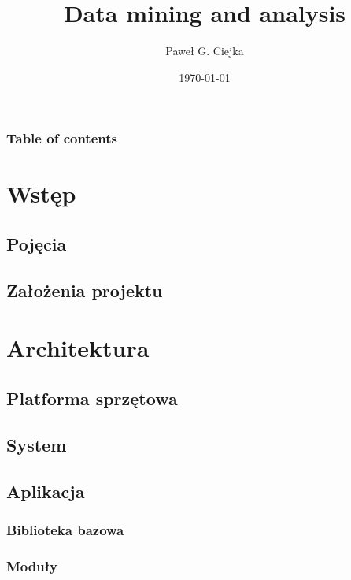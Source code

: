 \documentclass{beamer}
\title[Data mining and analysis]{Data mining and analysis}
\author[Ciejka, P. G.]{Paweł G. Ciejka}
\institute[RobCo]{RobCo Sp. z o. o. - Poland}
\date{\today}
\begin{document}
\begin{frame}
 \maketitle
\end{frame}

\begin{frame}[allowframebreaks]
\frametitle{Table of contents}
 \tableofcontents
\end{frame}

	\section{Wstęp}
        \subsection{Pojęcia}
		
		\subsection{Założenia projektu} 
		
    \section{Architektura}
    
        \subsection{Platforma sprzętowa}
        
        \subsection{System} 
        
        \subsection{Aplikacja} 
        
            \subsubsection{Biblioteka bazowa}
            
            \subsubsection{Moduły}
            
\end{document}
